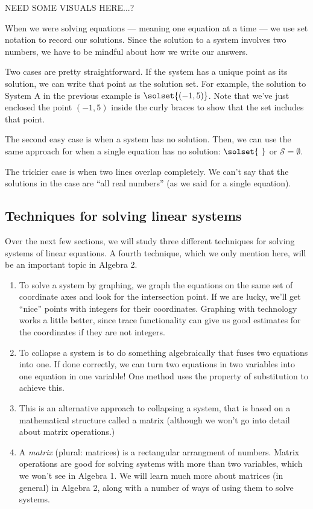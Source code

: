 NEED SOME VISUALS HERE...?

When we were solving equations --- meaning one equation at a time --- we use set notation to record our solutions. Since the solution to a system involves two numbers, we have to be mindful about how we write our answers.

Two cases are pretty straightforward. If the system has a unique point as its solution, we can write that point as the solution set. For example, the solution to System A in the previous example is $\solset{(-1,5)}$. Note that we've just enclosed the point $(-1,5)$ inside the curly braces to show that the set includes that point.

The second easy case is when a system has no solution. Then, we can use the same approach for when a single equation has no solution: $\solset{~}$ or $\mathcal{S}=\emptyset$.

The trickier case is when two lines overlap completely. We can't say that the solutions in the case are ``all real numbers'' (as we said for a single equation). 

\subsection{Techniques for solving linear systems}

Over the next few sections, we will study three different techniques for solving systems of linear equations. A fourth technique, which we only mention here, will be an important topic in Algebra 2.

\begin{enumerate}
\item {} To solve a system by graphing, we graph the equations on the same set of coordinate axes and look for the intersection point. If we are lucky, we'll get ``nice'' points with integers for their coordinates. Graphing with technology works a little better, since trace functionality can give us good estimates for the coordinates if they are not integers.

\item {} To collapse a system is to do something algebraically that fuses two equations into one. If done correctly, we can turn two equations in two variables into one equation in one variable! One method uses the property of substitution to achieve this.

\item {} This is an alternative approach to collapsing a system, that is based on a mathematical structure called a matrix (although we won't go into detail about matrix operations.)

\item {} A \textit{matrix} (plural: matrices) is a rectangular arrangment of numbers. Matrix operations are good for solving systems with more than two variables, which we won't see in Algebra 1. We will learn much more about matrices (in general) in Algebra 2, along with a number of ways of using them to solve systems.
\end{enumerate}

